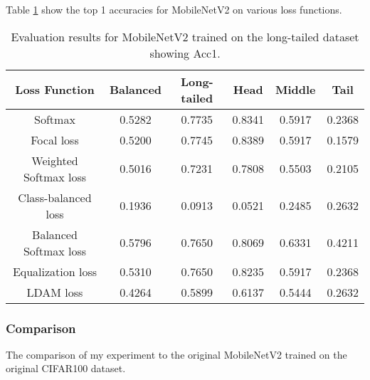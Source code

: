 Table \ref{tab:mobilenet_lt_acc1_1} show the top 1 accuracies for MobileNetV2 on various loss functions.

\begin{table}[H]
    \centering
    \begin{tabular}{cccccc}
        \toprule
        Loss Function & Balanced & Long-tailed & Head & Middle & Tail \\ 
        \midrule
        Softmax   & 0.5282   & 0.7735 & 0.8341 & 0.5917 & 0.2368 \\
        Focal loss   & 0.5200   & 0.7745 & 0.8389 & 0.5917 & 0.1579 \\
        Weighted Softmax loss   & 0.5016   & 0.7231 & 0.7808 & 0.5503 & 0.2105 \\
        Class-balanced loss   & 0.1936   & 0.0913 & 0.0521 & 0.2485 & 0.2632 \\
        Balanced Softmax loss   & 0.5796   & 0.7650 & 0.8069 & 0.6331 & 0.4211 \\
        Equalization loss   & 0.5310   & 0.7650 & 0.8235 & 0.5917 & 0.2368 \\
        LDAM loss   & 0.4264 & 0.5899 & 0.6137 & 0.5444 & 0.2632 \\
        \bottomrule
    \end{tabular}
    \caption{Evaluation results for MobileNetV2 trained on the long-tailed dataset showing Acc1.}
    \label{tab:mobilenet_lt_acc1_1}
\end{table}

\subsubsection{Comparison}

The comparison of my experiment to the original MobileNetV2 trained on the original CIFAR100 dataset.


